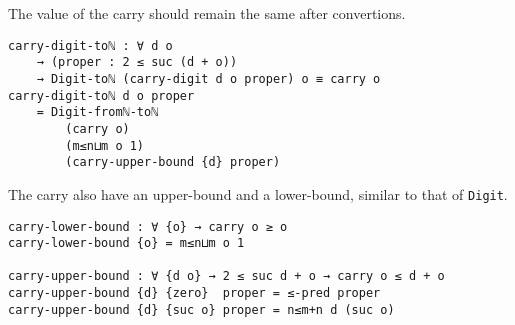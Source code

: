\documentclass[\main/thesis.tex]{subfiles}
\begin{document}
The value of the carry should remain the same after convertions.

\begin{lstlisting}
carry-digit-toℕ : ∀ d o
    → (proper : 2 ≤ suc (d + o))
    → Digit-toℕ (carry-digit d o proper) o ≡ carry o
carry-digit-toℕ d o proper
    = Digit-fromℕ-toℕ
        (carry o)
        (m≤n⊔m o 1)
        (carry-upper-bound {d} proper)
\end{lstlisting}

The carry also have an upper-bound and a lower-bound,
similar to that of {\lstinline|Digit|}.

\begin{lstlisting}
carry-lower-bound : ∀ {o} → carry o ≥ o
carry-lower-bound {o} = m≤n⊔m o 1

carry-upper-bound : ∀ {d o} → 2 ≤ suc d + o → carry o ≤ d + o
carry-upper-bound {d} {zero}  proper = ≤-pred proper
carry-upper-bound {d} {suc o} proper = n≤m+n d (suc o)
\end{lstlisting}
\end{document}
